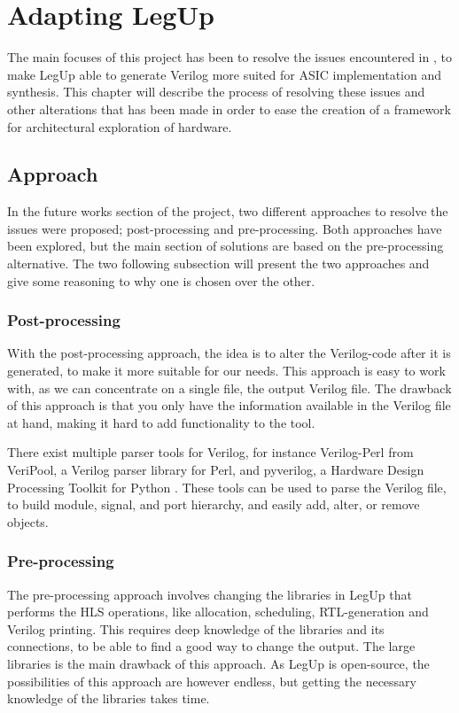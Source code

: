 \chapter{Adapting LegUp}
The main focuses of this project has been to resolve the issues encountered in \cite{holm2015pro}, to make LegUp able to generate Verilog more suited for ASIC implementation and synthesis. This chapter will describe the process of resolving these issues and other alterations that has been made in order to ease the creation of a framework for architectural exploration of hardware.
\section{Approach}
In the future works section of the project, two different approaches to resolve the issues were proposed; post-processing and pre-processing. Both approaches have been explored, but the main section of solutions are based on the pre-processing alternative. The two following subsection will present the two approaches and give some reasoning to why one is chosen over the other.
\subsection{Post-processing}
With the post-processing approach, the idea is to alter the Verilog-code after it is generated, to make it more suitable for our needs. This approach is easy to work with, as we can concentrate on a single file, the output Verilog file. The drawback of this approach is that you only have the information available in the Verilog file at hand, making it hard to add functionality to the tool.

There exist multiple parser tools for Verilog, for instance Verilog-Perl from VeriPool, a Verilog parser library for Perl, and pyverilog, a Hardware Design Processing Toolkit for Python \cite{Takamaeda2015Pyverilog}. These tools can be used to parse the Verilog file, to build module, signal, and port hierarchy, and easily add, alter, or remove objects.
\subsection{Pre-processing}
The pre-processing approach involves changing the libraries in LegUp that performs the HLS operations, like allocation, scheduling, RTL-generation and Verilog printing. This requires deep knowledge of the libraries and its connections, to be able to find a good way to change the output. The large libraries is the main drawback of this approach. As LegUp is open-source, the possibilities of this approach are however endless, but getting the necessary knowledge of the libraries takes time.
